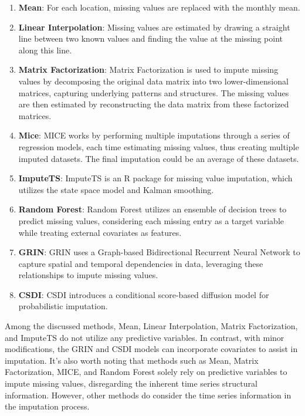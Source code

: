 \documentclass[11pt]{article}
\begin{document}
\begin{enumerate}
	\item \textbf{Mean}: For each location, missing values are replaced with the monthly mean.
	\item \textbf{Linear Interpolation}: Missing values are estimated by drawing a straight line between two known values and finding the value at the missing point along this line.
	\item \textbf{Matrix Factorization}: Matrix Factorization is used to impute missing values by decomposing the original data matrix into two lower-dimensional matrices, capturing underlying patterns and structures. The missing values are then estimated by reconstructing the data matrix from these factorized matrices.
	\item \textbf{Mice}: MICE \citep{white2011multiple} works by performing multiple imputations through a series of regression models, each time estimating missing values, thus creating multiple imputed datasets. The final imputation could be an average of these datasets.
	\item \textbf{ImputeTS}:  ImputeTS \citep{moritz2017imputets} is an R package for missing value imputation, which utilizes the state space model and Kalman smoothing.
	\item \textbf{Random Forest}: Random Forest \citep{breiman2001random} utilizes an ensemble of decision trees to predict missing values, considering each missing entry as a target variable while treating external covariates as features.
	\item \textbf{GRIN}: GRIN \citep{cini2021filling} uses a Graph-based Bidirectional Recurrent Neural Network to capture spatial and temporal dependencies in data, leveraging these relationships to impute missing values.
	\item \textbf{CSDI}: CSDI \citep{tashiro2021csdi} introduces a conditional score-based diffusion model for probabilistic imputation.
\end{enumerate}


Among the discussed methods, Mean, Linear Interpolation, Matrix Factorization, and ImputeTS do not utilize any predictive variables. In contrast, with minor modifications, the GRIN and CSDI models can incorporate covariates to assist in imputation. It's also worth noting that methods such as Mean, Matrix Factorization, MICE, and Random Forest solely rely on predictive variables to impute missing values, disregarding the inherent time series structural information. However, other methods do consider the time series information in the imputation process.
\end{document}
